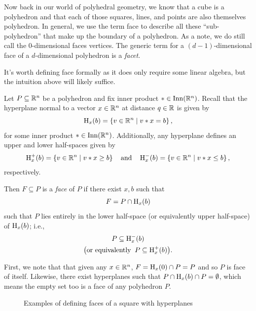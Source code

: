 \documentclass[12pt,oneside]{../../sfsuthesis}
\begin{document}
Now back in our world of polyhedral geometry, we know that a cube is a polyhedron and that each of those squares, lines, and points are also themselves polyhedron.
In general, we use the term face to describe all these ``sub-polyhedron'' that make up the boundary of a polyhedron.
As a note, we do still call the \( 0 \)-dimensional faces vertices.
The generic term for a \( (d - 1) \)-dimensional face of a \( d \)-dimensional polyhedron is a \textit{facet}.

It's worth defining face formally as it does only require some linear algebra, but the intuition above will likely suffice.
\begin{definition}[Face]\th\label{def:face}
    Let \( P \subseteq \mathbb{R}^n \) be a polyhedron and fix inner product \( \ast \in \operatorname{Inn}(\mathbb{R}^n) \).
    Recall that the hyperplane normal to a vector \( x \in \mathbb{R}^n \) at distance \( q \in \mathbb{R} \)  is given by
    \[
        \operatorname{H}_x(b) = \left\{ v \in \mathbb{R}^n \; \middle| \; v \ast x = b \right\},
    \]
    for some inner product \(\ast \in \operatorname{Inn}(\mathbb{R}^n) \).
    Additionally, any hyperplane defines an upper and lower half-spaces given by
    \[
        \operatorname{H}^{+}_x(b) = \left\{ v \in \mathbb{R}^n \; \middle| \; v \ast x \geq b \right\} \quad \text{and} \quad \operatorname{H}^{-}_x(b) = \left\{ v \in \mathbb{R}^n \; \middle| \; v \ast x \leq b \right\},
    \]
    respectively.

    Then \( F \subseteq P \) is a \emph{face} of \( P \) if there exist \( x, b \) such that
    \[
        F = P \cap \operatorname{H}_x(b)
    \]
    such that \( P \) lies entirely in the lower half-space (or equivalently upper half-space) of \( \operatorname{H}_x(b) \); i.e.,
    \begin{gather*}
        P \subseteq \operatorname{H}^{-}_x(b) \\
        \big( \text{or equivalently} \;\; P \subseteq \operatorname{H}^{+}_x(b) \big).
    \end{gather*}

\end{definition}
First, we note that that given any \( x \in \mathbb{R}^n \), \( F = \operatorname{H}_x(0) \cap P = P \) and so \( P \) is face of itself.
Likewise, there exist hyperplanes such that \( P \cap \operatorname{H}_x(b) \cap P = \emptyset \), which means the empty set too is a face of any polyhedron \( P \).
\begin{figure}[H]
    \centering
    \caption{Examples of defining faces of a square with hyperplanes}
\end{figure}
\end{document}
